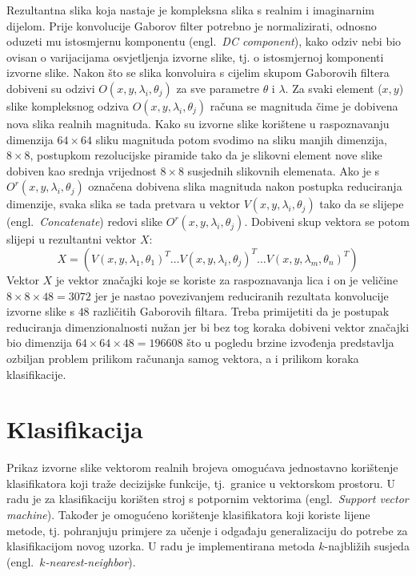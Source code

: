 \documentclass[12pt,a4paper]{ReportAA}
\newcommand{\engl}[1]{(engl.~\emph{#1})}
\begin{document}
Rezultantna slika koja nastaje je kompleksna slika s realnim i imaginarnim
dijelom. Prije konvolucije Gaborov filter potrebno je normalizirati, odnosno
oduzeti mu istosmjernu komponentu \engl{DC component}, kako odziv nebi bio ovisan
o varijacijama osvjetljenja izvorne slike, tj. o istosmjernoj komponenti izvorne
slike. Nakon što se slika konvoluira s cijelim skupom Gaborovih filtera dobiveni
su odzivi $O(x,y,\lambda_i, \theta_j)$ za sve parametre $\theta$ i $\lambda$. Za
svaki element ($x,y$) slike kompleksnog odziva $O(x,y,\lambda_i, \theta_j)$
računa se magnituda čime je dobivena nova slika realnih magnituda. Kako su
izvorne slike korištene u raspoznavanju dimenzija $64\times64$ sliku magnituda potom
svodimo na sliku manjih dimenzija, $8\times8$, postupkom rezolucijske piramide
tako da je slikovni element nove slike dobiven kao srednja vrijednost $8\times8$
susjednih slikovnih elemenata. Ako je s $O^{r}(x,y,\lambda_i, \theta_j)$
označena dobivena slika magnituda nakon postupka reduciranja dimenzije, svaka
slika se tada pretvara u vektor $V(x,y,\lambda_i, \theta_j)$ tako da se
slijepe \engl{Concatenate} redovi slike $O^{r}(x,y,\lambda_i, \theta_j)$.
Dobiveni skup vektora se potom slijepi u rezultantni vektor $X$:
\begin{equation}
 X = \left ( V(x,y,\lambda_1, \theta_1)^T \ldots
V(x,y,\lambda_i, \theta_j)^T \ldots V(x,y,\lambda_m, \theta_n)^T \right )
\end{equation}
Vektor $X$ je vektor značajki koje se koriste za raspoznavanja lica i on
je veličine $8\times8\times48 = 3072$  jer je nastao povezivanjem reduciranih
rezultata konvolucije izvorne slike s $48$ različitih Gaborovih filtara. Treba
primijetiti da je postupak reduciranja dimenzionalnosti nužan jer bi bez tog koraka
dobiveni vektor značajki bio dimenzija $64\times64\times48 = 196608$ što u
pogledu brzine izvođenja predstavlja ozbiljan problem prilikom računanja samog
vektora, a i prilikom koraka klasifikacije.


\chapter{Klasifikacija}

Prikaz izvorne slike vektorom realnih brojeva omogućava jednostavno korištenje
klasifikatora koji traže decizijske funkcije, tj.~granice u vektorskom
prostoru. U radu je za klasifikaciju korišten stroj s potpornim vektorima \engl{Support
vector machine}. Također je omogućeno korištenje klasifikatora koji koriste lijene metode, 
tj. pohranjuju primjere za učenje i odgađaju generalizaciju do potrebe za klasifikacijom
novog uzorka. U radu je implementirana metoda $k$-najbližih susjeda \engl{$k$-nearest-neighbor}.
\end{document}
